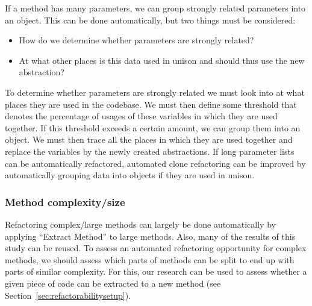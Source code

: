 If a method has many parameters, we can group strongly related parameters into an object. This can be done automatically, but two things must be considered:
\begin{itemize}
  \item How do we determine whether parameters are strongly related?
  \item At what other places is this data used in unison and should thus use the new abstraction?
\end{itemize}
To determine whether parameters are strongly related we must look into at what places they are used in the codebase. We must then define some threshold that denotes the percentage of usages of these variables in which they are used together. If this threshold exceeds a certain amount, we can group them into an object. We must then trace all the places in which they are used together and replace the variables by the newly created abstractions. If long parameter lists can be automatically refactored, automated clone refactoring can be improved by automatically grouping data into objects if they are used in unison.

\subsubsection{Method complexity/size}


Refactoring complex/large methods can largely be done automatically by applying ``Extract Method'' to large methods. Also, many of the results of this study can be reused. To assess an automated refactoring opportunity for complex methods, we should assess which parts of methods can be split to end up with parts of similar complexity. For this, our research can be used to assess whether a given piece of code can be extracted to a new method (see Section~\ref{sec:refactorabilitysetup}).

